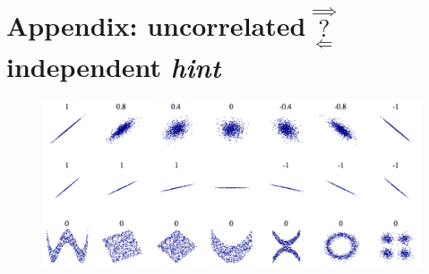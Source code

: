 \documentclass[11pt, oneside]{article}
\begin{document}
\section*{Appendix: uncorrelated $\overset{\Longrightarrow}{\underset{\Longleftarrow}{?}}$ independent \emph{hint}}

\begin{figure}[h] 
   \centering
   \includegraphics[width=5.5in]{cors.png}  
\end{figure}  
\end{document}
